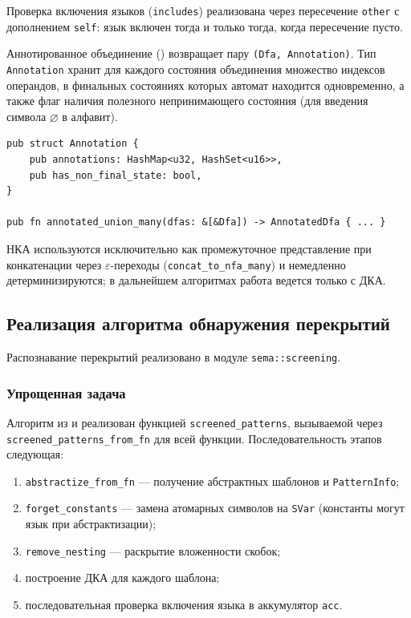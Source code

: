 Проверка включения языков (\texttt{includes}) реализована через пересечение \texttt{other} с дополнением \texttt{self}: язык включен тогда и только тогда, когда пересечение пусто.

Аннотированное объединение () возвращает пару \texttt{(Dfa, Annotation)}.
Тип \texttt{Annotation} хранит для каждого состояния объединения множество индексов операндов, в финальных состояниях которых автомат находится одновременно, а также флаг наличия полезного непринимающего состояния (для введения символа $\varnothing$ в алфавит).

\begin{listing}[H]
\caption{Аннотированное объединение ДКА}
\label{lst:annotated-union}
\begin{verbatim}
pub struct Annotation {
    pub annotations: HashMap<u32, HashSet<u16>>,
    pub has_non_final_state: bool,
}

pub fn annotated_union_many(dfas: &[&Dfa]) -> AnnotatedDfa { ... }
\end{verbatim}
\end{listing}

НКА используются исключительно как промежуточное представление при конкатенации через $\varepsilon$-переходы (\texttt{concat\_to\_nfa\_many}) и немедленно детерминизируются; в дальнейшем алгоритмах работа ведется только с ДКА.

\subsection{Реализация алгоритма обнаружения перекрытий}

Распознавание перекрытий реализовано в модуле \texttt{sema::screening}.

\subsubsection{Упрощенная задача}

Алгоритм из  и  реализован функцией \texttt{screened\_patterns}, вызываемой через \texttt{screened\_patterns\_from\_fn} для всей функции.
Последовательность этапов следующая:
\begin{enumerate}
\item \texttt{abstractize\_from\_fn} --- получение абстрактных шаблонов и \texttt{PatternInfo};
\item \texttt{forget\_constants} --- замена атомарных символов на \texttt{SVar} (константы могут  язык при абстрактизации);
\item \texttt{remove\_nesting} --- раскрытие вложенности скобок;
\item построение ДКА для каждого шаблона;
\item последовательная проверка включения языка в аккумулятор \texttt{acc}.
\end{enumerate}

